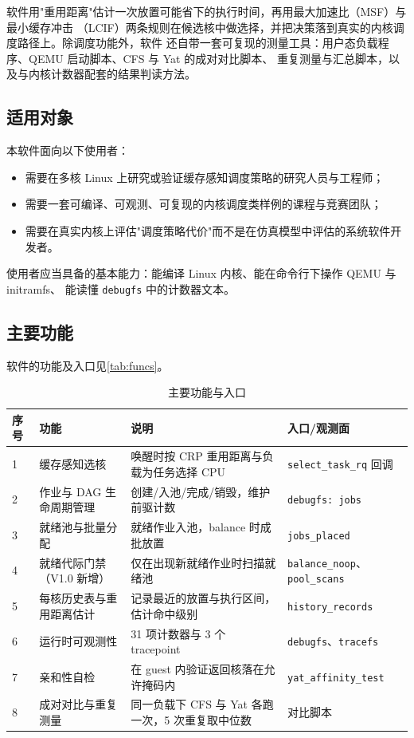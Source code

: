 \documentclass[11pt,a4paper]{article}
\newcommand{\code}[1]{\texttt{#1}}
\begin{document}
软件用"重用距离"估计一次放置可能省下的执行时间，再用最大加速比（MSF）与最小缓存冲击
（LCIF）两条规则在候选核中做选择，并把决策落到真实的内核调度路径上。除调度功能外，软件
还自带一套可复现的测量工具：用户态负载程序、QEMU 启动脚本、CFS 与 Yat 的成对对比脚本、
重复测量与汇总脚本，以及与内核计数器配套的结果判读方法。

\subsection{适用对象}

本软件面向以下使用者：

\begin{itemize}
  \item 需要在多核 Linux 上研究或验证缓存感知调度策略的研究人员与工程师；
  \item 需要一套可编译、可观测、可复现的内核调度类样例的课程与竞赛团队；
  \item 需要在真实内核上评估"调度策略代价"而不是在仿真模型中评估的系统软件开发者。
\end{itemize}

使用者应当具备的基本能力：能编译 Linux 内核、能在命令行下操作 QEMU 与 initramfs、
能读懂 \code{debugfs} 中的计数器文本。

\subsection{主要功能}

软件的功能及入口见\autoref{tab:funcs}。

\begin{table}[H]
\centering
\caption{主要功能与入口}
\label{tab:funcs}
\small
\begin{tabular}{@{}p{0.6cm}p{4.6cm}p{4.6cm}p{3.4cm}@{}}
\toprule
序号 & 功能 & 说明 & 入口/观测面 \\
\midrule
1 & 缓存感知选核 & 唤醒时按 CRP 重用距离与负载为任务选择 CPU & \code{select\_task\_rq} 回调 \\
2 & 作业与 DAG 生命周期管理 & 创建/入池/完成/销毁，维护前驱计数 & \code{debugfs: jobs} \\
3 & 就绪池与批量分配 & 就绪作业入池，balance 时成批放置 & \code{jobs\_placed} \\
4 & 就绪代际门禁（V1.0 新增） & 仅在出现新就绪作业时扫描就绪池 & \code{balance\_noop}、\code{pool\_scans} \\
5 & 每核历史表与重用距离估计 & 记录最近的放置与执行区间，估计命中级别 & \code{history\_records} \\
6 & 运行时可观测性 & 31 项计数器与 3 个 tracepoint & \code{debugfs}、\code{tracefs} \\
7 & 亲和性自检 & 在 guest 内验证返回核落在允许掩码内 & \code{yat\_affinity\_test} \\
8 & 成对对比与重复测量 & 同一负载下 CFS 与 Yat 各跑一次，5 次重复取中位数 & 对比脚本 \\
\bottomrule
\end{tabular}
\end{table}
\end{document}
